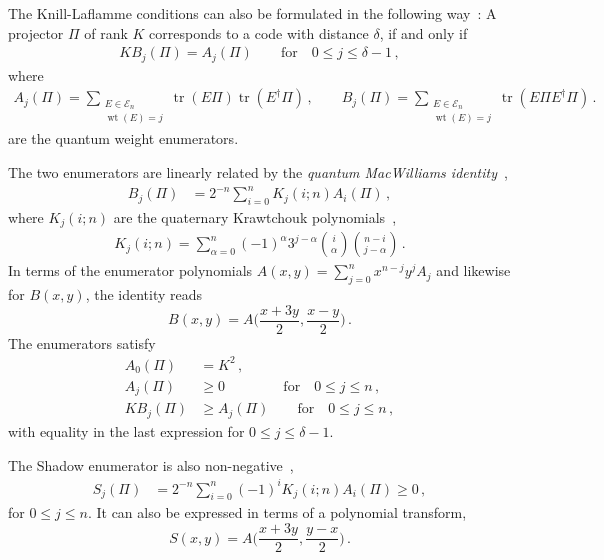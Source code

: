 \documentclass[12pt,a4paper]{amsart}
\DeclareMathOperator{\tr}{tr}
\DeclareMathOperator{\wt}{wt}
\renewcommand{\a}{\alpha}
\newcommand{\E}{\mathcal{E}}
\newcommand{\nn}{\nonumber}
\begin{document}
The Knill-Laflamme conditions can also be formulated in the following way~\cite{681316}: A projector $\Pi$ of rank $K$ corresponds to a code with distance $\delta$, if and only if
% 
\begin{align}\label{eq:klaflam}
    KB_j(\Pi)=A_j(\Pi) \quad\quad \text{for} \quad 0 \leq j\leq \delta-1 \,,
\end{align}
where 
% 
\begin{align}\label{eq:enum}
A_j(\Pi) = \sum_{\substack{E\in \E_n \\ \wt(E) = j}} \tr(E\Pi) \tr(E^\dagger\Pi)\,, \quad\quad  B_j(\Pi) =\sum_{\substack{E\in \E_n \\ \wt(E)=j}} \tr(E\Pi E^\dagger\Pi)  \,.
\end{align}
are the quantum weight enumerators.

% 
The two enumerators are linearly related by the {\it quantum MacWilliams identity}~\cite{PhysRevLett.78.1600,681316},
% 
\begin{align}\label{eq:macwill}
	B_j(\Pi) & = 2^{-n}\sum^n_{i=0} K_j(i;n)A_i(\Pi)\,,
\end{align}
where $K_j(i;n)$ are the quaternary Krawtchouk polynomials~\cite{macwilliams1977theory}, 
\begin{align}\label{eq:krawpoly}
		K_j(i;n) = \sum^n_{\alpha=0} (-1)^\a 3^{j-\a}
		\binom{i}{\alpha}  \binom{n-i}{j-\alpha}     \,.
\end{align}
%
In terms of the enumerator polynomials $A(x,y) = \sum_{j=0}^n x^{n-j} y^j A_j$ and likewise for $B(x,y)$, the identity reads
\begin{equation}
    B(x,y) = A\Big(\frac{x+3y}{2}, \frac{x-y}{2}\Big)\,.
\end{equation}
%
The enumerators satisfy
% 
\begin{align}
    A_0(\Pi) &= K^2\,,\nn\\
    A_j(\Pi) &\geq 0 \quad \quad \quad\quad \,\text{for} \quad 0 \leq j \leq n \,,\nn \\ 
    KB_j(\Pi) &\geq A_j(\Pi) \quad\quad \text{for} \quad 0\leq j\leq  n \,,
\end{align}
with equality in the last expression for $0\leq j \leq \delta-1$.


The Shadow enumerator
is also non-negative~\cite{796376},
% 
\begin{align}\label{eq:shadow}
 S_j(\Pi)& = 2^{-n}\sum^n_{i=0} (-1)^i K_j(i;n)A_i(\Pi) \geq 0 \,,
\end{align}
for $0 \leq j \leq n$. It can also be expressed in terms of a polynomial transform,
\begin{equation}
    S(x,y) = A\Big(\frac{x + 3y}{2}, \frac{y-x}{2}\Big)\,.
\end{equation}
\end{document}
